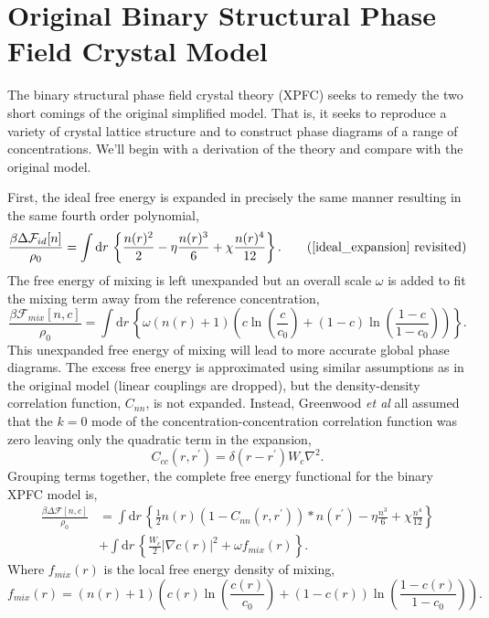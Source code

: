 \documentclass[showkeys, prb, reprint]{revtex4-1}
\renewcommand{\d}{\delta}       %
\newcommand{\F}{\mathcal{F}}    %
\renewcommand{\l}{\left}        %
\renewcommand{\r}{\right}       %
\newcommand{\f}{\frac}          %
\newcommand{\integrate}[1]{\int \mathrm{d}#1\,}
\begin{document}
\section{Original Binary Structural Phase Field Crystal Model} %

The binary structural phase field crystal theory (XPFC) seeks to remedy the two
short comings of the original simplified model. That is, it seeks to reproduce
a variety of crystal lattice structure and to construct  phase diagrams of a
range of concentrations. We'll begin with a derivation of the theory and
compare with the original model.

First, the ideal free energy is expanded in precisely the same manner resulting
in the same fourth order polynomial,
%
\begin{equation}
    \f{\beta\Delta\F_{id}[n]}{\rho_0} = \integrate{r}
        \l\lbrace \f{n(r)^2}{2} - \eta \f{n(r)^3}{6} + \chi\f{n(r)^4}{12}
        \r\rbrace. \tag{\ref{ideal_expansion} revisited}
\end{equation}
%
The free energy of mixing is left unexpanded but an overall scale $\omega$ is
added to fit the mixing term away from the reference concentration,
%
\begin{equation}
    \f{\beta\F_{mix}[n, c]}{\rho_0} =
        \integrate{r} \l\lbrace \omega (n(r) + 1)\l( 
            c\ln\l(\f{c}{c_0}\r) + (1-c)\ln\l(\f{1-c}{1-c_0}\r) \r)\r\rbrace. 
\end{equation}
%
This unexpanded free energy of mixing will lead to more accurate global phase
diagrams. The excess free energy is approximated using similar assumptions as
in the original model (linear couplings are dropped), but the density-density
correlation function, $C_{nn}$, is not expanded. Instead, Greenwood \textit{et
al} all assumed that the $k=0$ mode of the concentration-concentration
correlation function was zero leaving only the quadratic term in the expansion,
%
\begin{equation}
    C_{cc}(r, r^\prime) = \d(r - r^\prime)W_c \nabla^2.
\end{equation}
%
Grouping terms together, the complete free energy functional for the binary
XPFC model is,
%
\begin{align}
    \f{\beta\Delta\F[n, c]}{\rho_0} &= \integrate{r} \l\lbrace
        \f{1}{2} n(r) \l(1 - C_{nn}(r, r^\prime)\r) \ast n(r^\prime)
        - \eta \f{n^3}{6} + \chi \f{n^4}{12} \r\rbrace \\
        &+ \integrate{r}\l\lbrace
            \f{W_c}{2}\l\vert \nabla c(r) \r\vert^2 + \omega f_{mix}(r)
            \r\rbrace. \nonumber
\end{align}
%
Where $f_{mix}(r)$ is the local free energy density of mixing,
%
\begin{equation}
    f_{mix}(r) = \l(n(r) + 1\r)\l( 
            c(r)\ln\l(\f{c(r)}{c_0}\r) + (1-c(r))\ln\l(\f{1-c(r)}{1-c_0}\r) \r).
\end{equation}
%
\end{document}

